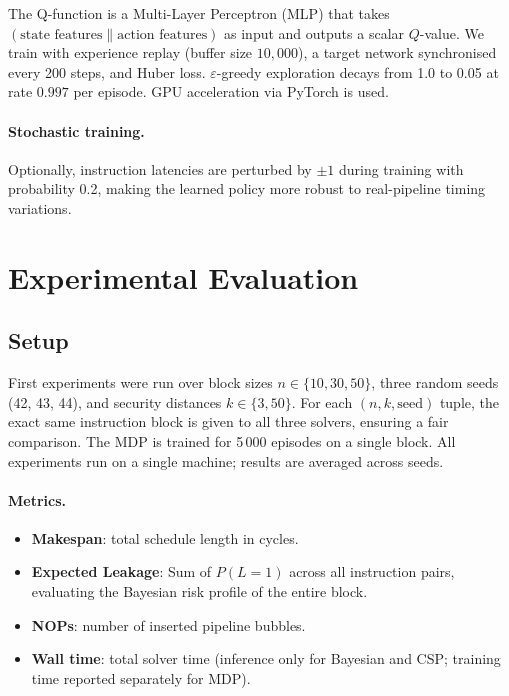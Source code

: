 \documentclass[letterpaper]{article}
\begin{document}
The Q-function is a Multi-Layer Perceptron (MLP) that takes
$(\text{state features} \| \text{action features})$ as input and
outputs a scalar $Q$-value.  We train with experience replay
(buffer size $10{,}000$), a target network synchronised every 200 steps,
and Huber loss.  $\varepsilon$-greedy exploration decays from 1.0 to
0.05 at rate $0.997$ per episode.  GPU acceleration via PyTorch is used.

\paragraph{Stochastic training.}
Optionally, instruction latencies are perturbed by $\pm 1$ during
training with probability 0.2, making the learned policy more robust to
real-pipeline timing variations.

\section{Experimental Evaluation}
\label{sec:experiments}

\subsection{Setup}

First experiments were run over block sizes $n \in \{10, 30, 50\}$, three
random seeds (42, 43, 44), and security distances $k \in \{3, 50\}$.
For each $(n, k, \text{seed})$ tuple, the exact same instruction block is
given to all three solvers, ensuring a fair comparison.  The MDP is
trained for 5\,000 episodes on a single block.  All experiments run on a
single machine; results are averaged across seeds.

\paragraph{Metrics.}
\begin{itemize}\setlength\itemsep{0pt}
  \item \textbf{Makespan}: total schedule length in cycles.
  \item \textbf{Expected Leakage}: Sum of $P(L=1)$ across all instruction pairs, evaluating the Bayesian risk profile of the entire block.
  \item \textbf{NOPs}: number of inserted pipeline bubbles.
  \item \textbf{Wall time}: total solver time (inference only for Bayesian and
        CSP; training time reported separately for MDP).
\end{itemize}
\end{document}
